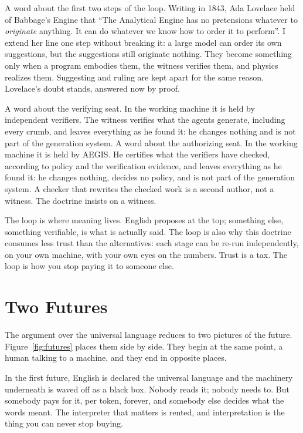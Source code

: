 \documentclass[11pt]{article}
\begin{document}
A word about the first two steps of the loop. Writing in 1843, Ada
Lovelace held of Babbage's Engine that ``The Analytical Engine has no
pretensions whatever to \emph{originate} anything. It can do whatever
we know how to order it to perform''\cite{lovelace43}. I extend
her line one step without breaking it: a large model can order
its own suggestions, but the suggestions still originate nothing.
They become something only when a program embodies them, the witness
verifies them, and physics realizes them. Suggesting and ruling are
kept apart for the same reason. Lovelace's doubt stands, answered now
by proof.

A word about the verifying seat. In the working machine it is held by
independent verifiers. The witness verifies what the agents generate,
including every crumb, and leaves everything as he found it: he
changes nothing and is not part of the generation system. A word about
the authorizing seat. In the working machine it is held by AEGIS. He
certifies what the verifiers have checked, according to policy and the
verification evidence, and leaves everything as he found it: he
changes nothing, decides no policy, and is not part of the generation
system. A checker that
rewrites the checked work is a second author, not a witness. The
doctrine insists on a witness.

The loop is where meaning lives. English proposes at the top;
something else, something verifiable, is what is actually said. The
loop is also why this doctrine consumes less trust than the
alternatives: each stage can be re-run independently, on your own
machine, with your own eyes on the numbers. Trust is a tax. The loop
is how you stop paying it to someone else.

\section{Two Futures}

The argument over the universal language reduces to two pictures of
the future. Figure~\ref{fig:futures} places them side by side. They
begin at the same point, a human talking to a machine, and they end in
opposite places.

In the first future, English is declared the universal language and
the machinery underneath is waved off as a black box. Nobody reads
it; nobody needs to. But somebody pays for it, per token, forever,
and somebody else decides what the words meant. The interpreter that
matters is rented, and interpretation is the thing you can never
stop buying.
\end{document}
